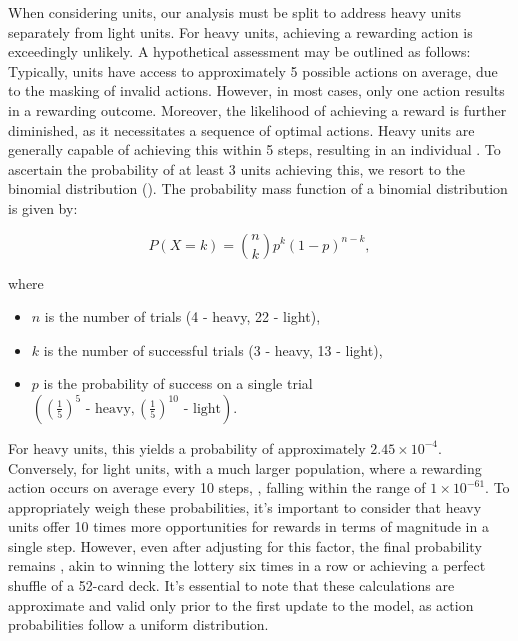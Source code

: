 \noindent When considering units, our analysis must be split to address heavy units separately from light units. For heavy units, achieving a rewarding action is exceedingly unlikely. A hypothetical assessment may be outlined as follows: Typically, units have access to approximately 5 possible actions on average, due to the masking of invalid actions. However, in most cases, only one action results in a rewarding outcome. Moreover, the likelihood of achieving a reward is further diminished, as it necessitates a sequence of optimal actions. Heavy units are generally capable of achieving this within 5 steps, resulting in an individual . To ascertain the probability of at least 3 units achieving this, we resort to the binomial distribution (\cite{enwiki:1223310929}). The probability mass function of a binomial distribution is given by:

\begin{equation}
P(X = k) = \binom{n}{k} p^k (1-p)^{n-k},
\label{eq:binomial}
\end{equation}

where

\begin{itemize}[itemsep=4pt, parsep=0pt]
    \item \( n \) is the number of trials (4 - heavy, 22 - light),
    \item \( k \) is the number of successful trials (3 - heavy, 13 - light),
    \item \( p \) is the probability of success on a single trial \( \left( (\frac{1}{5})^5 \text{ - heavy},  (\frac{1}{5})^{10}  \text{ - light} \right) \).
\end{itemize}



\noindent For heavy units, this yields a probability of approximately $2.45 \times 10^{-4}$. Conversely, for light units, with a much larger population, where a rewarding action occurs on average every 10 steps, , falling within the range of $1 \times 10^{-61}$. To appropriately weigh these probabilities, it's important to consider that heavy units offer 10 times more opportunities for rewards in terms of magnitude in a single step. However, even after adjusting for this factor, the final probability remains , akin to winning the lottery six times in a row or achieving a perfect shuffle of a 52-card deck. It's essential to note that these calculations are approximate and valid only prior to the first update to the model, as action probabilities follow a uniform distribution. 

